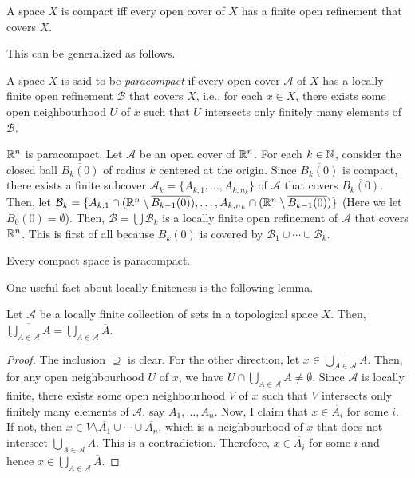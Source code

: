 \begin{proposition}
    A space \(X\) is compact iff every open cover of \(X\) has a finite open refinement that covers $X$.
\end{proposition}

This can be generalized as follows.

\begin{definition}
    A space \(X\) is said to be \emph{paracompact} if every open cover $\mathcal{A}$ of \(X\) has a locally finite open refinement $\mathcal{B}$ that covers $X$, i.e., for each $x\in X$, there exists some open neighbourhood $U$ of $x$ such that $U$ intersects only finitely many elements of $\mathcal{B}$.
\end{definition}

\begin{example}
    $\mathbb{R}^n$ is paracompact. Let $\mathcal{A}$ be an open cover of $\mathbb{R}^n$. For each $k\in \mathbb{N}$, consider the closed ball $\overline{B_k(0)}$ of radius $k$ centered at the origin. Since $\overline{B_k(0)}$ is compact, there exists a finite subcover $\mathcal{A}_k=\{A_{k,1},\ldots,A_{k,n_k}\}$ of $\mathcal{A}$ that covers $\overline{B_k(0)}$. Then, let $\mathcal{B}_k=\{A_{k,1}\cap (\mathbb{R}^n\setminus \overline{B_{k-1}(0)}),\ldots,A_{k,n_k}\cap (\mathbb{R}^n\setminus \overline{B_{k-1}(0)})\}$ (Here we let $B_0(0)=\emptyset$). Then, $\mathcal{B}=\bigcup \mathcal{B}_k$ is a locally finite open refinement of $\mathcal{A}$ that covers $\mathbb{R}^n$. This is first of all because $B_k(0)$ is covered by $\mathcal{B}_1\cup\cdots\cup \mathcal{B}_k$.
\end{example}

\begin{example}
    Every compact space is paracompact.
\end{example}


One useful fact about locally finiteness is the following lemma.
\begin{lemma}
    Let $\mathcal{A}$ be a locally finite collection of sets in a topological space $X$. Then, $\overline{\bigcup_{A\in \mathcal{A}}A} = \bigcup_{A\in \mathcal{A}} \overline{A}$.
   
   
\end{lemma}
\begin{proof}


    The inclusion $\supseteq$ is clear. For the other direction, let $x\in \overline{\bigcup_{A\in \mathcal{A}}A}$. Then, for any open neighbourhood $U$ of $x$, we have $U\cap {\bigcup_{A\in \mathcal{A}}A}\neq \emptyset$. Since $\mathcal{A}$ is locally finite, there exists some open neighbourhood $V$ of $x$ such that $V$ intersects only finitely many elements of $\mathcal{A}$, say $A_1,\ldots,A_n$. Now, I claim that $x\in \overline{A_i}$ for some $i$. If not, then $x\in V\setminus \overline{A_1}\cup\cdots\cup \overline{A_n}$, which is a neighbourhood of $x$ that does not intersect $\bigcup_{A\in \mathcal{A}}A$. This is a contradiction. Therefore, $x\in \overline{A_i}$ for some $i$ and hence $x\in \bigcup_{A\in \mathcal{A}} \overline{A}$.
\end{proof}


